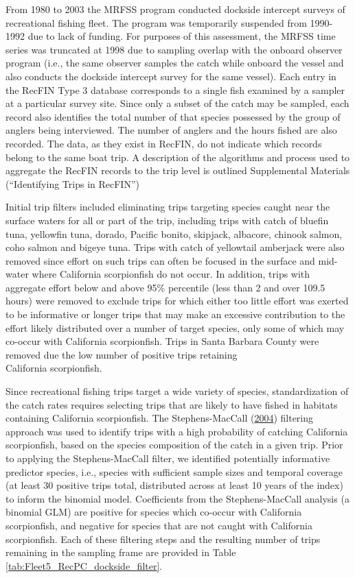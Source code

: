 \documentclass[12pt,]{article}
\begin{document}
From 1980 to 2003 the MRFSS program conducted dockside intercept surveys
of recreational fishing fleet. The program was temporarily suspended
from 1990-1992 due to lack of funding. For purposes of this assessment,
the MRFSS time series was truncated at 1998 due to sampling overlap with
the onboard observer program (i.e., the same observer samples the catch
while onboard the vessel and also conducts the dockside intercept survey
for the same vessel). Each entry in the RecFIN Type 3 database
corresponds to a single fish examined by a sampler at a particular
survey site. Since only a subset of the catch may be sampled, each
record also identifies the total number of that species possessed by the
group of anglers being interviewed. The number of anglers and the hours
fished are also recorded. The data, as they exist in RecFIN, do not
indicate which records belong to the same boat trip. A description of
the algorithms and process used to aggregate the RecFIN records to the
trip level is outlined Supplemental Materials (``Identifying Trips in
RecFIN'')

Initial trip filters included eliminating trips targeting species caught
near the surface waters for all or part of the trip, including trips
with catch of bluefin tuna, yellowfin tuna, dorado, Pacific bonito,
skipjack, albacore, chinook salmon, coho salmon and bigeye tuna. Trips
with catch of yellowtail amberjack were also removed since effort on
such trips can often be focused in the surface and mid-water where
California scorpionfish do not occur. In addition, trips with aggregate
effort below and above 95\% percentile (less than 2 and over 109.5
hours) were removed to exclude trips for which either too little effort
was exerted to be informative or longer trips that may make an excessive
contribution to the effort likely distributed over a number of target
species, only some of which may co-occur with California scorpionfish.
Trips in Santa Barbara County were removed due the low number of
positive trips retaining\\
California scorpionfish.

Since recreational fishing trips target a wide variety of species,
standardization of the catch rates requires selecting trips that are
likely to have fished in habitats containing California scorpionfish.
The Stephens-MacCall (\protect\hyperlink{ref-Stephens2004}{2004})
filtering approach was used to identify trips with a high probability of
catching California scorpionfish, based on the species composition of
the catch in a given trip. Prior to applying the Stephens-MacCall
filter, we identified potentially informative predictor species, i.e.,
species with sufficient sample sizes and temporal coverage (at least 30
positive trips total, distributed across at least 10 years of the index)
to inform the binomial model. Coefficients from the Stephens-MacCall
analysis (a binomial GLM) are positive for species which co-occur with
California scorpionfish, and negative for species that are not caught
with California scorpionfish. Each of these filtering steps and the
resulting number of trips remaining in the sampling frame are provided
in Table \ref{tab:Fleet5_RecPC_dockside_filter}.
\end{document}
